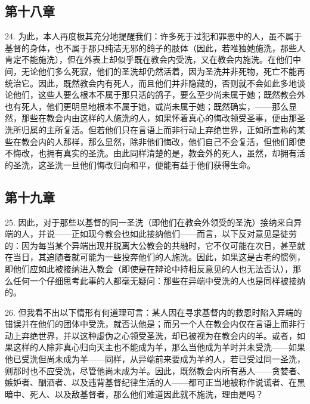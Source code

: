 
\subsection{第十八章}

24. 为此，本人再度极其充分地提醒我们：许多死于过犯和罪恶中的人，虽不属于基督的身体，也不属于那只纯洁无邪的鸽子的肢体（因此，若唯独她施洗，那些人肯定不能施洗），但在外表上却似乎既在教会内受洗，又在教会内施洗。在他们中间，无论他们多么死寂，他们的圣洗却仍然活着，因为圣洗并非死物，死亡不能再统治它。因此，既然教会内有死人，而且他们并非隐藏的，否则就不会如此多地谈论他们，这些人要么根本不属于那只活的鸽子，要么至少尚未属于她；既然教会外也有死人，他们更明显地根本不属于她，或尚未属于她；既然确实，——那么显然，那些在教会内由这样的人施洗的人，如果怀着真心的悔改领受圣事，便由那圣洗所归属的主所复活。但若他们只在言语上而非行动上弃绝世界，正如所宣称的某些在教会内的人那样，那么显然，除非他们悔改，他们自己不会复活，但他们即使不悔改，也拥有真实的圣洗。由此同样清楚的是，教会外的死人，虽然，却拥有活的圣洗，这圣洗一旦他们悔改归向和平，便能有益于他们获得生命。\par


\subsection{第十九章}

25. 因此，对于那些以基督的同一圣洗（即他们在教会外领受的圣洗）接纳来自异端的人，并说——正如现今教会也如此接纳他们——而言，以下反对意见是徒劳的：因为每当某个异端出现并脱离大公教会的共融时，它不仅可能在次日，甚至就在当日，其追随者就可能为一些投奔他们的人施洗。因此，如果这是古老的惯例，即他们应如此被接纳进入教会（即使是在辩论中持相反意见的人也无法否认），那么任何一个仔细思考此事的人都毫无疑问：那些在异端中受洗的人也是同样被接纳的。\par

26. 但我看不出以下情形有何道理可言：某人因在寻求基督内的救恩时陷入异端的错误并在他们的团体中受洗，就否认他是；而另一个人在教会内仅在言语上而非行动上弃绝世界，并以这种虚伪之心领受圣洗，却已被视为在教会内的羊。或者，如果这样的人除非真心归向天主也不能成为羊，那么当他成为羊时并未受洗——如果他已受洗但尚未成为羊——同样，从异端前来要成为羊的人，若已受过同一圣洗，则那时也不应受洗，尽管他尚未成为羊。因此，既然教会内所有恶人——贪婪者、嫉妒者、酗酒者、以及违背基督纪律生活的人——都可正当地被称作说谎者、在黑暗中、死人、以及敌基督者，那么他们难道因此就不施洗，理由是吗？\par

